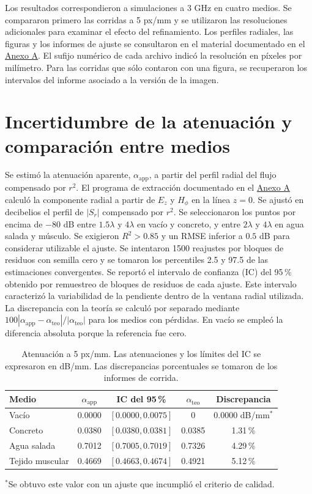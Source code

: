 \renewcommand{\tablename}{Cuadro}
Los resultados correspondieron a simulaciones a 3 GHz en cuatro medios. Se compararon primero las corridas a 5 px/mm y se utilizaron las resoluciones adicionales para examinar el efecto del refinamiento. Los perfiles radiales, las figuras y los informes de ajuste se consultaron en el material documentado en el \hyperref[an:fdtd-fuentes]{Anexo A}. El sufijo numérico de cada archivo indicó la resolución en píxeles por milímetro. Para las corridas que sólo contaron con una figura, se recuperaron los intervalos del informe asociado a la versión de la imagen.

\section{Incertidumbre de la atenuación y comparación entre medios}
Se estimó la atenuación aparente, $\alpha_{\mathrm{app}}$, a partir del perfil radial del flujo compensado por $r^2$. El programa de extracción documentado en el \hyperref[an:fdtd-fuentes]{Anexo A} calculó la componente radial a partir de $E_z$ y $H_\phi$ en la línea $z=0$. Se ajustó en decibelios el perfil de $|S_r|$ compensado por $r^2$. Se seleccionaron los puntos por encima de $-80$ dB entre $1.5\lambda$ y $4\lambda$ en vacío y concreto, y entre $2\lambda$ y $4\lambda$ en agua salada y músculo. Se exigieron $R^2>0.85$ y un RMSE inferior a $0.5$ dB para considerar utilizable el ajuste. Se intentaron 1500 reajustes por bloques de residuos con semilla cero y se tomaron los percentiles 2.5 y 97.5 de las estimaciones convergentes. Se reportó el intervalo de confianza (IC) del 95\,\% obtenido por remuestreo de bloques de residuos de cada ajuste. Este intervalo caracterizó la variabilidad de la pendiente dentro de la ventana radial utilizada. La discrepancia con la teoría se calculó por separado mediante $100|\alpha_{\mathrm{app}}-\alpha_{\mathrm{teo}}|/|\alpha_{\mathrm{teo}}|$ para los medios con pérdidas. En vacío se empleó la diferencia absoluta porque la referencia fue cero.

\begin{table}[htbp]\centering\small
\caption{Atenuación a 5 px/mm. Las atenuaciones y los límites del IC se expresaron en dB/mm. Las discrepancias porcentuales se tomaron de los informes de corrida.}\label{tab:fdtd-base}
\begin{tabular}{lcccc}\hline
Medio & $\alpha_{\mathrm{app}}$ & IC del 95\,\% & $\alpha_{\mathrm{teo}}$ & Discrepancia \\ \hline
Vacío & 0.0000 & $[0.0000,0.0075]$ & 0 & $0.0000$ dB/mm$^{*}$ \\
Concreto & 0.0380 & $[0.0380,0.0381]$ & 0.0385 & 1.31\,\% \\
Agua salada & 0.7012 & $[0.7005,0.7019]$ & 0.7326 & 4.29\,\% \\
Tejido muscular & 0.4669 & $[0.4663,0.4674]$ & 0.4921 & 5.12\,\% \\ \hline
\end{tabular}
\par\smallskip\footnotesize $^{*}$Se obtuvo este valor con un ajuste que incumplió el criterio de calidad.
\end{table}

